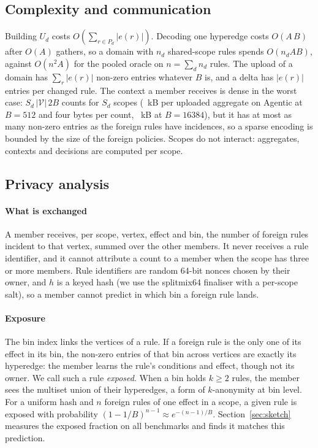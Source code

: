 \documentclass[preprint,12pt]{elsarticle}
\theoremstyle{definition}
\begin{document}
\subsection{Complexity and communication}
Building $U_d$ costs $O(\sum_{r\in P_d}|e(r)|)$. Decoding one hyperedge costs $O(A\,B)$ after $O(A)$ gathers, so a domain with $n_d$ shared-scope rules spends $O(n_d A B)$, against $O(n^2A)$ for the pooled oracle on $n=\sum_d n_d$ rules. The upload of a domain has $\sum_{r}|e(r)|$ non-zero entries whatever $B$ is, and a delta has $|e(r)|$ entries per changed rule. The context a member receives is dense in the worst case: $S_d\,|\mathcal V|\,2B$ counts for $S_d$ scopes (\skagenticdensekBdxii~kB per uploaded aggregate on Agentic at $B=512$ and four bytes per count, \skagenticdensekBsixteenk~kB at $B=16384$), but it has at most as many non-zero entries as the foreign rules have incidences, so a sparse encoding is bounded by the size of the foreign policies. Scopes do not interact: aggregates, contexts and decisions are computed per scope.

\subsection{Privacy analysis}
\label{sec:privacy}
\paragraph{What is exchanged} A member receives, per scope, vertex, effect and bin, the number of foreign rules incident to that vertex, summed over the other members. It never receives a rule identifier, and it cannot attribute a count to a member when the scope has three or more members. Rule identifiers are random 64-bit nonces chosen by their owner, and $h$ is a keyed hash (we use the splitmix64 finaliser with a per-scope salt), so a member cannot predict in which bin a foreign rule lands.

\paragraph{Exposure} The bin index links the vertices of a rule. If a foreign rule is the only one of its effect in its bin, the non-zero entries of that bin across vertices are exactly its hyperedge: the member learns the rule's conditions and effect, though not its owner. We call such a rule \emph{exposed}. When a bin holds $k\ge2$ rules, the member sees the multiset union of their hyperedges, a form of $k$-anonymity at bin level. For a uniform hash and $n$ foreign rules of one effect in a scope, a given rule is exposed with probability $(1-1/B)^{n-1}\approx e^{-(n-1)/B}$. Section~\ref{sec:sketch} measures the exposed fraction on all benchmarks and finds it matches this prediction.
\end{document}
